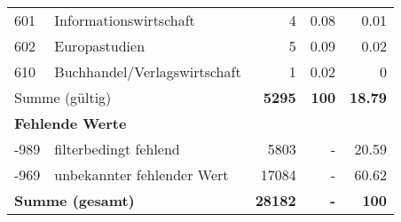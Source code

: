 \begin{longtable}{lXrrr}
        601 & \multicolumn{1}{X}{Informationswirtschaft} & %
          \num{4} &
          \num[round-mode=places,round-precision=2]{0,08} &
          \num[round-mode=places,round-precision=2]{0,01} \\

        602 & \multicolumn{1}{X}{Europastudien} & %
          \num{5} &
          \num[round-mode=places,round-precision=2]{0,09} &
          \num[round-mode=places,round-precision=2]{0,02} \\

        610 & \multicolumn{1}{X}{Buchhandel/Verlagswirtschaft} & %
          \num{1} &
          \num[round-mode=places,round-precision=2]{0,02} &
          \num[round-mode=places,round-precision=2]{0} \\

     \midrule
     \multicolumn{2}{l}{Summe (gültig)} &
       \textbf{\num{5295}} &
     \textbf{100} &
       \textbf{\num[round-mode=places,round-precision=2]{18,79}} \\
     \multicolumn{5}{l}{\textbf{Fehlende Werte}}\\
       -989 &
       filterbedingt fehlend &
         \num{5803} &
        - &
         \num[round-mode=places,round-precision=2]{20,59} \\
       -969 &
       unbekannter fehlender Wert &
         \num{17084} &
        - &
         \num[round-mode=places,round-precision=2]{60,62} \\
     \midrule
     \multicolumn{2}{l}{\textbf{Summe (gesamt)}} &
          \textbf{\num{28182}} &
        \textbf{-} &
        \textbf{100} \\
     \bottomrule
     \end{longtable}
     

